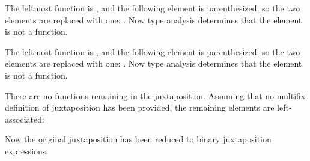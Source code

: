 The leftmost function is , and the following element
is parenthesized, so the two elements are replaced with one:
.
Now type analysis determines that the element
 is not a function.

The leftmost function is ,
and the following element 
is parenthesized, so the two elements are replaced with one:
.
Now type analysis determines that the element 
is not a function.

There are no functions remaining in the juxtaposition.  Assuming
that no multifix definition of juxtaposition has been provided,
the remaining elements are left-associated:
\begin{center}
\end{center}
Now the original juxtaposition has been reduced to binary juxtaposition
expressions.
